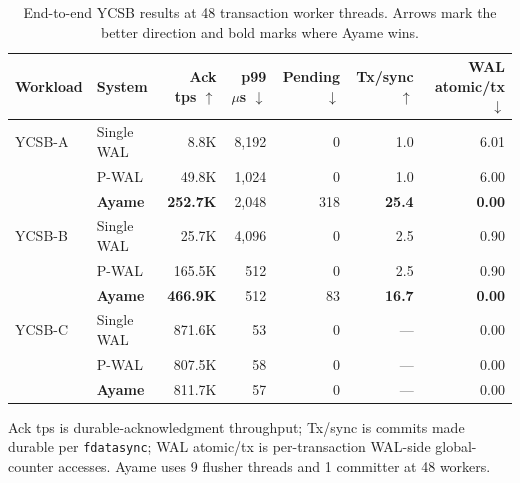 \begin{table}[t]
  \centering
  \caption{End-to-end YCSB results at 48 transaction worker threads.  Arrows mark the better direction and bold marks where Ayame wins.}
  \label{tab:ycsbabc-48worker-summary}
  \small
  \setlength{\tabcolsep}{6pt}
  \begin{tabular}{llrrrrr}
    \toprule
    Workload & System & Ack tps $\uparrow$ & p99 $\mu$s $\downarrow$ & Pending $\downarrow$ & Tx/sync $\uparrow$ & WAL atomic/tx $\downarrow$ \\
    \midrule
    YCSB-A & Single WAL & 8.8K & 8,192 & 0 & 1.0 & 6.01 \\
     & P-WAL & 49.8K & 1,024 & 0 & 1.0 & 6.00 \\
     & \textbf{Ayame} & \textbf{252.7K} & 2,048 & 318 & \textbf{25.4} & \textbf{0.00} \\
    \midrule
    YCSB-B & Single WAL & 25.7K & 4,096 & 0 & 2.5 & 0.90 \\
     & P-WAL & 165.5K & 512 & 0 & 2.5 & 0.90 \\
     & \textbf{Ayame} & \textbf{466.9K} & 512 & 83 & \textbf{16.7} & \textbf{0.00} \\
    \midrule
    YCSB-C & Single WAL & 871.6K & 53 & 0 & --- & 0.00 \\
     & P-WAL & 807.5K & 58 & 0 & --- & 0.00 \\
     & \textbf{Ayame} & 811.7K & 57 & 0 & --- & 0.00 \\
    \bottomrule
  \end{tabular}

  \vspace{1.5mm}
  {\footnotesize Ack tps is durable-acknowledgment throughput; Tx/sync is commits made durable per \texttt{fdatasync}; WAL atomic/tx is per-transaction WAL-side global-counter accesses.  Ayame uses 9 flusher threads and 1 committer at 48 workers.}
\end{table}
